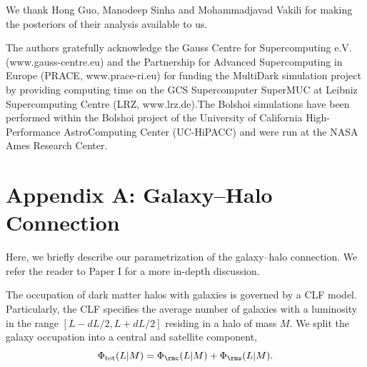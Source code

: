\documentclass[fleqn,usenatbib,useAMS]{mnras}
\begin{document}
We thank Hong Guo, Manodeep Sinha and Mohammadjavad Vakili for making the posteriors of their analysis available to us.

The authors gratefully acknowledge the Gauss Centre for Supercomputing e.V. (www.gauss-centre.eu) and the Partnership for Advanced Supercomputing in Europe (PRACE, www.prace-ri.eu) for funding the MultiDark simulation project by providing computing time on the GCS Supercomputer SuperMUC at Leibniz Supercomputing Centre (LRZ, www.lrz.de).The Bolshoi simulations have been performed within the Bolshoi project of the University of California High-Performance AstroComputing Center (UC-HiPACC) and were run at the NASA Ames Research Center.

\label{lastpage}




\section*{Appendix A: Galaxy--Halo Connection}
\label{sec:galaxy_halo_connection}

Here, we briefly describe our parametrization of the galaxy--halo connection. We refer the reader to Paper I for a more in-depth discussion.

The occupation of dark matter halos with galaxies is governed by a CLF model. Particularly, the CLF specifies the average number of galaxies with a luminosity in the range $[L - dL/2, L + dL/2]$ residing in a halo of mass $M$. We split the galaxy occupation into a central and satellite component,
\begin{equation}
\Phi_{\rm tot}(L | M) = \Phi_\rmc (L | M) + \Phi_\rms (L | M).
\end{equation}
\end{document}
